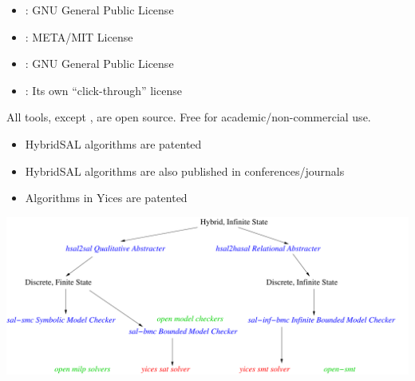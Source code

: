 \documentclass{seminar}
\begin{document}
\begin{slide}

\begin{itemize}
\item
 {}: GNU General Public License
\item
 {}: META/MIT License
\item
 {}:  GNU General Public License
\item
 {}: Its own ``click-through'' license
\end{itemize}

All tools, except {}, are open source.
Free for academic/non-commercial use.

\begin{itemize}
\item HybridSAL algorithms are patented
\item HybridSAL algorithms are also published in conferences/journals
\item Algorithms in Yices are patented
\end{itemize}

\end{slide}
\begin{slide}

\hspace*{-2em}\includegraphics[angle=0,scale=0.48]{sal-tools}

\end{slide}
\end{document}
